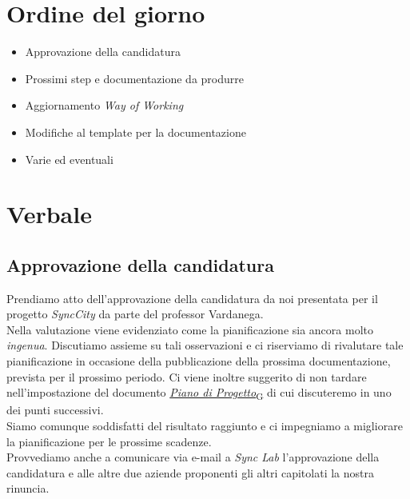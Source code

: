 \documentclass[italian,12pt]{article} %
\begin{document}
\section{Ordine del giorno}
\begin{itemize}
	\itemsep0em
	\item Approvazione della candidatura
	\item Prossimi step e documentazione da produrre
	\item Aggiornamento \textit{Way of Working}
	\item Modifiche al template per la documentazione
	\item Varie ed eventuali
\end{itemize}

\newpage

\section{Verbale}

\subsection{Approvazione della candidatura}
Prendiamo atto dell'approvazione della candidatura da noi presentata per il progetto
\textit{SyncCity} da parte del professor Vardanega. \\
Nella valutazione viene evidenziato come la pianificazione sia ancora molto \textit{ingenua}.
Discutiamo assieme su tali osservazioni e ci riserviamo di rivalutare tale
pianificazione in occasione della pubblicazione della prossima documentazione,
prevista per il prossimo periodo. Ci viene inoltre suggerito di
non tardare nell'impostazione del documento \href{https://7last.github.io/docs/rtb/documentazione-interna/glossario\#piano-di-progetto}{\textit{Piano di Progetto}\textsubscript{G}} di cui
discuteremo in uno dei punti successivi. \\
Siamo comunque soddisfatti del risultato raggiunto e ci impegniamo a migliorare la
pianificazione per le prossime scadenze. \\
Provvediamo anche a comunicare via e-mail a \textit{Sync Lab} l'approvazione della
candidatura e alle altre due aziende proponenti gli altri capitolati la nostra
rinuncia.
\end{document}
